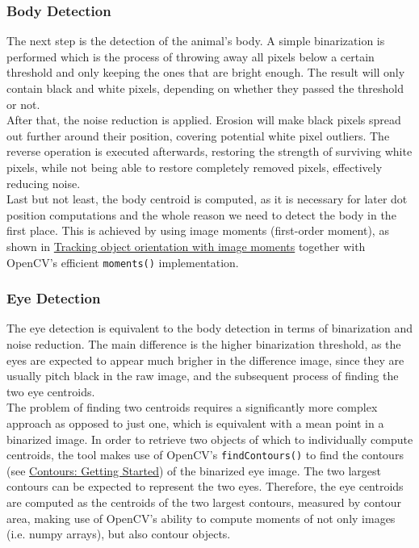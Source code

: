 \documentclass[12pt]{article}
\begin{document}
\subsubsection*{Body Detection}
The next step is the detection of the animal's body. A simple binarization is performed which is the process of throwing away all pixels below a certain threshold and only keeping the ones that are bright enough. The result will only contain black and white pixels, depending on whether they passed the threshold or not.\\
After that, the noise reduction is applied. Erosion will make black pixels spread out further around their position, covering potential white pixel outliers. The reverse operation is executed afterwards, restoring the strength of surviving white pixels, while not being able to restore completely removed pixels, effectively reducing noise.\\
Last but not least, the body centroid is computed, as it is necessary for later dot position computations and the whole reason we need to detect the body in the first place. This is achieved by using image moments (first-order moment), as shown in \href{ https://raphael.candelier.fr/?blog=Image%20Moments}{Tracking object orientation with image moments} together with OpenCV's efficient \Verb|moments()| implementation.

\subsubsection*{Eye Detection}
The eye detection is equivalent to the body detection in terms of binarization and noise reduction. The main difference is the higher binarization threshold, as the eyes are expected to appear much brigher in the difference image, since they are usually pitch black in the raw image, and the subsequent process of finding the two eye centroids.\\
The problem of finding two centroids requires a significantly more complex approach as opposed to just one, which is equivalent with a mean point in a binarized image. In order to retrieve two objects of which to individually compute centroids, the tool makes use of OpenCV's \Verb|findContours()| to find the contours (see \href{https://docs.opencv.org/3.4/d4/d73/tutorial_py_contours_begin.html}{Contours: Getting Started}) of the binarized eye image. The two largest contours can be expected to represent the two eyes. Therefore, the eye centroids are computed as the centroids of the two largest contours, measured by contour area, making use of OpenCV's ability to compute moments of not only images (i.e. numpy arrays), but also contour objects.
\end{document}
